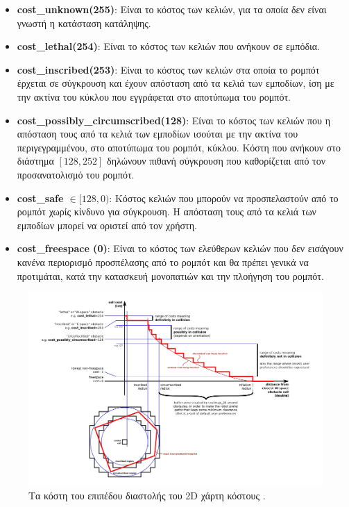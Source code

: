 \begin{itemize}
	\item \textbf{cost{\_}unknown(255)}: Είναι το κόστος των κελιών, για τα οποία δεν είναι γνωστή η κατάσταση κατάληψης.
	\item \textbf{cost{\_}lethal(254)}: Είναι το κόστος των κελιών που ανήκουν σε εμπόδια.
	\item \textbf{cost{\_}inscribed(253)}: Είναι το κόστος των κελιών στα οποία το ρομπότ έρχεται σε σύγκρουση και έχουν απόσταση από τα κελιά των εμποδίων, ίση με την ακτίνα του κύκλου που εγγράφεται στο αποτύπωμα του ρομπότ.
	\item \textbf{cost{\_}possibly{\_}circumscribed(128)}: Είναι το κόστος των κελιών που η απόσταση τους από τα κελιά των εμποδίων ισούται με την ακτίνα του περιγεγραμμένου, στο αποτύπωμα του ρομπότ, κύκλου. Κόστη που ανήκουν στο διάστημα $[128, 252]$ δηλώνουν πιθανή σύγκρουση που καθορίζεται από τον προσανατολισμό του ρομπότ.
	\item \textbf{cost{\_}safe $\in [128,0)$}: Κόστος κελιών που μπορούν να προσπελαστούν από το ρομπότ χωρίς κίνδυνο για σύγκρουση. Η απόσταση τους από τα κελιά των εμποδίων μπορεί να οριστεί από τον χρήστη. 
	\item \textbf{cost{\_}freespace (0)}: Είναι το κόστος των ελεύθερων κελιών που δεν εισάγουν κανένα περιορισμό προσπέλασης από το ρομπότ και θα πρέπει γενικά να προτιμάται, κατά την κατασκευή μονοπατιών και την πλοήγηση του ρομπότ.
\end{itemize}

\begin{figure}[!ht]
	\centering
	\includegraphics[width=\linewidth]{Chapters/Chapter4/Figures/costmap_inflation_costs.png}
	\caption{Τα κόστη του επιπέδου διαστολής του 2D χάρτη κόστους \cite{costmap_2d}.}
	\label{fig:costmap_inflation_costs}
\end{figure}


